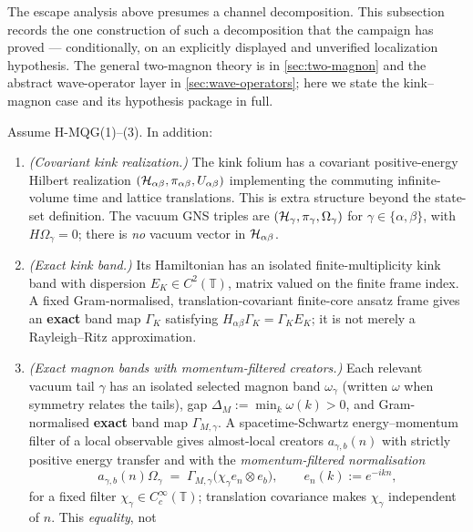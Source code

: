 The escape analysis above presumes a channel decomposition. This subsection
records the one construction of such a decomposition that the campaign has
proved --- conditionally, on an explicitly displayed and unverified
localization hypothesis. The general two-magnon theory is in
\cref{sec:two-magnon} and the abstract wave-operator layer in
\cref{sec:wave-operators}; here we state the kink--magnon case and its
hypothesis package in full.

\begin{definition}
\label{def:d28}
Assume H-MQG(1)--(3). In addition:
\begin{enumerate}
\item \emph{(Covariant kink realization.)} The kink folium has a covariant
positive-energy Hilbert realization
$(\mathcal{H}_{\alpha\beta},\pi_{\alpha\beta},U_{\alpha\beta})$ implementing the
commuting infinite-volume time and lattice translations. This is extra
structure beyond the state-set definition. The vacuum GNS triples are
$(\mathcal{H}_\gamma,\pi_\gamma,\Omega_\gamma)$ for $\gamma\in\{\alpha,\beta\}$, with
$H\Omega_\gamma=0$; there is \emph{no} vacuum vector in
$\mathcal{H}_{\alpha\beta}$.
\item \emph{(Exact kink band.)} Its Hamiltonian has an isolated
finite-multiplicity kink band with dispersion $E_K\in C^2(\mathbb{T})$, matrix
valued on the finite frame index. A fixed Gram-normalised,
translation-covariant finite-core ansatz frame gives an \textbf{exact} band map
$\Gamma_K$ satisfying $H_{\alpha\beta}\Gamma_K=\Gamma_KE_K$; it is not merely
a Rayleigh--Ritz approximation.
\item \emph{(Exact magnon bands with momentum-filtered creators.)} Each
relevant vacuum tail $\gamma$ has an isolated selected magnon band
$\omega_\gamma$ (written $\omega$ when symmetry relates the tails), gap
$\Delta_M:=\min_k\omega(k)>0$, and Gram-normalised \textbf{exact} band map
$\Gamma_{M,\gamma}$. A spacetime-Schwartz energy--momentum filter of a local
observable gives almost-local creators $a_{\gamma,b}(n)$ with strictly positive
energy transfer and with the \emph{momentum-filtered normalisation}
\begin{equation}
  a_{\gamma,b}(n)\Omega_\gamma
  \;=\;\Gamma_{M,\gamma}\bigl(\chi_\gamma e_n\otimes e_b\bigr),
  \qquad e_n(k):=e^{-ikn},
  \label{eq:filtered-creator}
\end{equation}
for a fixed filter $\chi_\gamma\in C_c^\infty(\mathbb{T})$; translation
covariance makes $\chi_\gamma$ independent of $n$. This \emph{equality}, not

\end{enumerate}
\end{definition}
